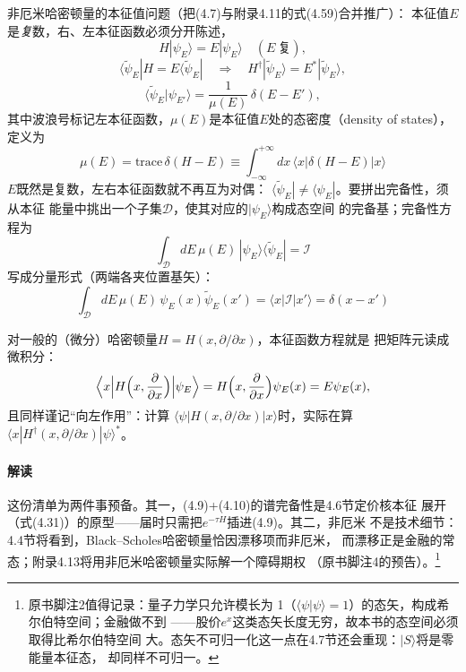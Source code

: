 非厄米哈密顿量的本征值问题（把(4.7)与附录4.11的式(4.59)合并推广）：
本征值$E$是\emph{复}数，右、左本征函数必须分开陈述，
\begin{equation*}
H|\psi_{E}\rangle=E|\psi_{E}\rangle
\quad(E\ \text{复}),
\end{equation*}
\begin{equation*}
\langle\tilde{\psi}_{E}|H=E\langle\tilde{\psi}_{E}|
\quad\Longrightarrow\quad
H^{\dagger}|\tilde{\psi}_{E}\rangle=E^{*}|\tilde{\psi}_{E}\rangle,
\end{equation*}
\begin{equation*}
\langle\tilde{\psi}_{E}|\psi_{E'}\rangle
=\frac{1}{\mu(E)}\,\delta(E-E'),
\end{equation*}
其中波浪号标记左本征函数，$\mu(E)$是本征值$E$处的态密度（density of
states），定义为
\begin{equation*}
\mu(E)=\mathrm{trace}\,\delta(H-E)
\equiv\int_{-\infty}^{+\infty}dx\,\langle x|\delta(H-E)|x\rangle
\tag{4.8}
\end{equation*}
$E$既然是复数，左右本征函数就不再互为对偶：
$\langle\tilde{\psi}_{E}|\neq\langle\psi_{E}|$。要拼出完备性，须从本征
能量中挑出一个子集$\mathcal{D}$，使其对应的$|\psi_{E}\rangle$构成态空间
的完备基；完备性方程为
\begin{equation*}
\int_{\mathcal{D}}dE\,\mu(E)\,|\psi_{E}\rangle\langle\tilde{\psi}_{E}|
=\mathcal{I}
\tag{4.9}
\end{equation*}
写成分量形式（两端各夹位置基矢）：
\begin{equation*}
\int_{\mathcal{D}}dE\,\mu(E)\,\psi_{E}(x)\tilde{\psi}_{E}(x')
=\langle x|\mathcal{I}|x'\rangle=\delta(x-x')
\tag{4.10}
\end{equation*}

对一般的（微分）哈密顿量$H=H(x,\partial/\partial x)$，本征函数方程就是
把矩阵元读成微积分：
\begin{equation*}
\Bigl\langle x\Bigl|H\Bigl(x,\frac{\partial}{\partial x}\Bigr)
\Bigr|\psi_{E}\Bigr\rangle
=H\Bigl(x,\frac{\partial}{\partial x}\Bigr)\psi_{E}(x)=E\psi_{E}(x),
\end{equation*}
且同样谨记“向左作用”：计算
$\langle\psi|H(x,\partial/\partial x)|x\rangle$时，实际在算
$\langle x|H^{\dagger}(x,\partial/\partial x)|\psi\rangle^{*}$。

\paragraph{解读}
这份清单为两件事预备。其一，(4.9)+(4.10)的谱完备性是4.6节定价核本征
展开（式(4.31)）的原型——届时只需把$e^{-\tau H}$插进(4.9)。其二，非厄米
不是技术细节：4.4节将看到，Black--Scholes哈密顿量恰因漂移项而非厄米，
而漂移正是金融的常态；附录4.13将用非厄米哈密顿量实际解一个障碍期权
（原书脚注4的预告）。\footnote{原书脚注2值得记录：量子力学只允许模长为
1（$\langle\psi|\psi\rangle=1$）的态矢，构成希尔伯特空间；金融做不到
——股价$e^{x}$这类态矢长度无穷，故本书的态空间必须取得比希尔伯特空间
大。态矢不可归一化这一点在4.7节还会重现：$|S\rangle$将是零能量本征态，
却同样不可归一。}

